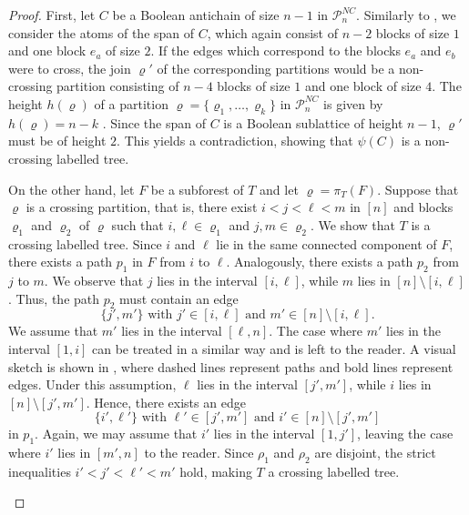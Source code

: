 \documentclass{preprint}
\newcommand{\cP}{\mathcal{P}}
\theoremstyle{definition}
\begin{document}
\begin{proof}
First, let $C$ be a Boolean antichain of size $n-1$ in $\cP_n^{NC}$. Similarly to , we consider the atoms of the span of $C$, which again consist of $n-2$ blocks of size $1$ and one block $e_a$ of size $2$. If the edges which correspond to the blocks $e_a$ and $e_b$ were to cross, the join $\varrho'$ of the corresponding partitions would be a non-crossing partition consisting of $n-4$ blocks of size $1$ and one block of size $4$. The height $h(\varrho)$ of a partition $\varrho=\{\varrho_1,\dots,\varrho_k\}$ in $\cP_n^{NC}$ is given by $h(\varrho)=n-k$ \cite{Kreweras}. Since the span of $C$ is a Boolean sublattice of height $n-1$, $\varrho'$ must be of height $2$. This yields a contradiction, showing that $\psi(C)$ is a non-crossing labelled tree.

On the other hand, let $F$ be a subforest of $T$ and let $\varrho = \pi_T(F)$. Suppose that $\varrho$ is a crossing partition, that is, there exist $i< j< \ell< m$ in $[n]$ and blocks $\varrho_1$ and $\varrho_2$ of $\varrho$ such that $i, \ell\in \varrho_1$ and $j, m\in \varrho_2$. We show that $T$ is a crossing labelled tree. 
Since $i$ and $\ell$ lie in the same connected component of $F$, there exists a path $p_1$ in $F$ from $i$ to $\ell$. Analogously, there exists a path $p_2$ from $j$ to $m$. We observe that $j$ lies in the interval $[i, \ell]$, while $m$ lies in $[n]\setminus[i,\ell]$. Thus, the path $p_2$ must contain an edge 
\[\{j',m'\} \text{ with } j'\in [i, \ell] \text{ and } m'\in[n]\setminus[i, \ell].\]
We assume that $m'$ lies in the interval $[\ell,n]$. The case where $m'$ lies in the interval $[1,i]$ can be treated in a similar way and is left to the reader. A visual sketch is shown in , where dashed lines represent paths and bold lines represent edges. Under this assumption, $\ell$ lies in the interval $[j', m']$, while $i$ lies in $[n]\setminus[j', m']$. Hence, there exists an edge 
\[\{i',\ell'\} \text{ with } \ell'\in [j', m'] \text{ and } i'\in[n]\setminus[j', m']\]
in $p_1$. Again, we may assume that $i'$ lies in the interval $[1,j']$, leaving the case where $i'$ lies in $[m',n]$ to the reader. Since $\rho_1$ and $\rho_2$ are disjoint, the strict inequalities $i'< j'< \ell'< m'$ hold, making $T$ a crossing labelled tree.

\usetikzlibrary{decorations.pathmorphing}
\begin{figure}
\centering
\begin{minipage}{0.3\textwidth}
\end{minipage}
\end{figure}
\end{proof}
\end{document}
